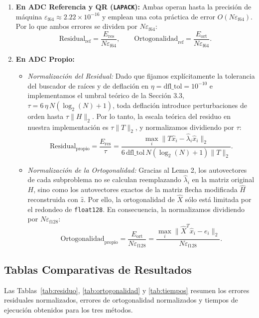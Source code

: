 \documentclass[11pt,a4paper]{article}
\begin{document}
\begin{enumerate}
    \item \textbf{En ADC Referencia y QR (\texttt{LAPACK}):} Ambas operan hasta la precisión de máquina $\varepsilon_{\text{f64}} \approx 2.22 \times 10^{-16}$ y emplean una cota práctica de error $O(N \varepsilon_{\text{f64}})$. Por lo que ambos errores se dividen por $N \varepsilon_{\text{f64}}$:
    $$\text{Residual}_{\text{ref}} = \frac{E_{\text{res}}}{N \varepsilon_{\text{f64}}}, \qquad \text{Ortogonalidad}_{\text{ref}} = \frac{E_{\text{ort}}}{N \varepsilon_{\text{f64}}}.$$
    \item \textbf{En ADC Propio:}
    \begin{itemize}
        \item \textit{Normalización del Residual:} Dado que fijamos explícitamente la tolerancia del buscador de raíces y de deflación en $\eta = \text{dfl\_tol} = 10^{-10}$ e implementamos el umbral teórico de la Sección 3.3, $\tau = 6 \, \eta \, N (\log_2(N) + 1)$, toda deflación introduce perturbaciones de orden hasta $\tau \|H\|_2$. Por lo tanto, la escala teórica del residuo en nuestra implementación es $\tau \|T\|_2$, y normalizamos dividiendo por $\tau$:
        $$\text{Residual}_{\text{propio}} = \frac{E_{\text{res}}}{\tau} = \frac{\max_i \|T \hat{x}_i - \hat{\lambda}_i \hat{x}_i\|_2}{6 \, \text{dfl\_tol} \, N (\log_2(N) + 1) \|T\|_2}.$$
        \item \textit{Normalización de la Ortogonalidad:} Gracias al Lema 2, los autovectores de cada subproblema no se calculan reemplazando $\hat{\lambda}_i$ en la matriz original $H$, sino como los autovectores exactos de la matriz flecha modificada $\hat{H}$ reconstruida con $\hat{z}$. Por ello, la ortogonalidad de $\hat{X}$ sólo está limitada por el redondeo de \texttt{float128}. En consecuencia, la normalizamos dividiendo por $N \varepsilon_{\text{f128}}$:
        $$\text{Ortogonalidad}_{\text{propio}} = \frac{E_{\text{ort}}}{N \varepsilon_{\text{f128}}} = \frac{\max_i \|\hat{X}^T \hat{x}_i - e_i\|_2}{N \varepsilon_{\text{f128}}}.$$
    \end{itemize}
\end{enumerate}

\subsection{Tablas Comparativas de Resultados}

Las Tablas~\ref{tab:residuo}, \ref{tab:ortogonalidad} y \ref{tab:tiempos} resumen los errores residuales normalizados, errores de ortogonalidad normalizados y tiempos de ejecución obtenidos para los tres métodos.
\end{document}
